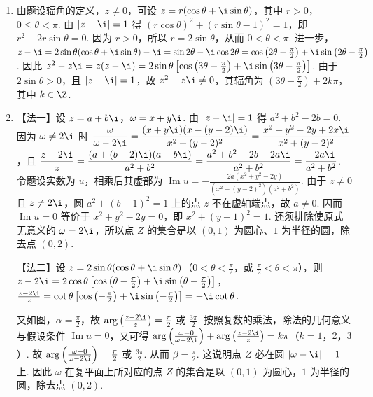 \begin{solution}
\begin{enumerate}
\item 由题设辐角的定义，\(z\neq0\)，可设 \(z=r(\cos\theta+\i\sin\theta)\)，其中 \(r>0\)，\(0\leqslant\theta<\pi\). 由 \(|z-\i|=1\) 得 \((r\cos\theta)^2+(r\sin\theta-1)^2=1\)，即 \(r^2-2r\sin\theta=0\). 因为 \(r>0\)，所以 \(r=2\sin\theta\)，从而 \(0<\theta<\pi\). 进一步，
\(z-\i=2\sin\theta(\cos\theta+\i\sin\theta)-\i=\sin2\theta-\i\cos2\theta=\cos\left(2\theta-\frac{\pi}{2}\right)+\i\sin\left(2\theta-\frac{\pi}{2}\right)\).
因此
\(z^2-z\i=z(z-\i)=2\sin\theta\left[\cos\left(3\theta-\frac{\pi}{2}\right)+\i\sin\left(3\theta-\frac{\pi}{2}\right)\right]\). 由于 \(2\sin\theta>0\)，且 \(|z-\i|=1\)，故 \(z^2-z\i\neq0\)，其辐角为 \(\left(3\theta-\frac{\pi}{2}\right)+2k\pi\)，其中 \(k\in\Z\).
\item 【法一】设 \(z=a+b\i\)，\(\omega=x+y\i\). 由 \(|z-\i|=1\) 得 \(a^2+b^2-2b=0\). 因为 \(\omega\neq2\i\) 时
\(\displaystyle\frac{\omega}{\omega-2\i}=\frac{(x+y\i)(x-(y-2)\i)}{x^2+(y-2)^2}=\frac{x^2+y^2-2y+2x\i}{x^2+(y-2)^2}\)，且
\(\displaystyle\frac{z-2\i}{z}=\frac{(a+(b-2)\i)(a-b\i)}{a^2+b^2}=\frac{a^2+b^2-2b-2a\i}{a^2+b^2}=\frac{-2a\i}{a^2+b^2}\). 令题设实数为 \(u\)，相乘后其虚部为
\(\displaystyle\operatorname{Im}u=-\frac{2a(x^2+y^2-2y)}{(x^2+(y-2)^2)(a^2+b^2)}\). 由于 \(z\neq0\) 且 \(z\neq2\i\)，圆 \(a^2+(b-1)^2=1\) 上的点 \(z\) 不在虚轴端点，故 \(a\neq0\). 因而 \(\operatorname{Im}u=0\) 等价于 \(x^2+y^2-2y=0\)，即 \(x^2+(y-1)^2=1\). 还须排除使原式无意义的 \(\omega=2\i\)，所以点 \(Z\) 的集合是以 \((0,1)\) 为圆心、\(1\) 为半径的圆，除去点 \((0,2)\).

【法二】设 \(z = 2\sin\theta(\cos\theta + \i\sin\theta)\)（\(0 < \theta < \frac{\pi}{2}\)，或 \(\frac{\pi}{2} < \theta < \pi\)），则 \(z - 2\i = 2\cos\theta\left[\cos\left(\theta - \frac{\pi}{2}\right) + \i\sin\left(\theta - \frac{\pi}{2}\right)\right]\)，
\(\frac{z - 2\i}{z} = \cot\theta\left[\cos\left(-\frac{\pi}{2}\right) + \i\sin\left(-\frac{\pi}{2}\right)\right] = -\i\cot\theta\).

又如图，\(\alpha = \frac{\pi}{2}\)，故 \(\arg\left(\frac{z - 2\i}{z}\right) = \frac{\pi}{2}\) 或 \(\frac{3\pi}{2}\). 按照复数的乘法，除法的几何意义与假设条件 \(\operatorname{Im}u = 0\)，又可得 \(\arg\left(\frac{\omega - 0}{\omega - 2\i}\right) + \arg\left(\frac{z - 2\i}{z}\right) = k\pi\)（\(k = 1\)，\(2\)，\(3\)）.
故 \(\arg\left(\frac{\omega - 0}{\omega - 2\i}\right) = \frac{\pi}{2}\) 或 \(\frac{3\pi}{2}\). 从而 \(\beta = \frac{\pi}{2}\). 这说明点 \(Z\) 必在圆 \(|\omega - \i| = 1\) 上. 因此 \(\omega\) 在复平面上所对应的点 \(Z\) 的集合是以 \((0,1)\) 为圆心，\(1\) 为半径的圆，除去点 \((0,2)\).
\end{enumerate}
\end{solution}


